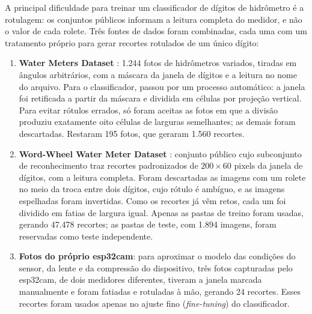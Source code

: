 A principal dificuldade para treinar um classificador de dígitos de hidrômetro é a
rotulagem: os conjuntos públicos informam a leitura completa do medidor, e não o valor de
cada rolete. Três fontes de dados foram combinadas, cada uma com um tratamento próprio
para gerar recortes rotulados de um único dígito:

\begin{enumerate}
    \item \textbf{Water Meters Dataset} \cite{kucev2020}: 1.244 fotos de hidrômetros
    variados, tiradas em ângulos arbitrários, com a máscara da janela de dígitos e a
    leitura no nome do arquivo. Para o classificador, passou por um processo automático: a janela foi retificada a partir da
    máscara e dividida em células por projeção vertical. Para evitar rótulos errados, só
    foram aceitas as fotos em que a divisão produziu exatamente oito células de larguras
    semelhantes; as demais foram descartadas. Restaram 195 fotos, que geraram 1.560 recortes.
    \item \textbf{Word-Wheel Water Meter Dataset} \cite{zhao2026wordwheel}: conjunto público
    cujo subconjunto de reconhecimento traz recortes padronizados de $200 \times 60$ pixels
    da janela de dígitos, com a leitura completa. Foram descartadas as imagens com um rolete
    no meio da troca entre dois dígitos, cujo rótulo é ambíguo, e as imagens espelhadas
    foram invertidas. Como os recortes já vêm retos, cada um foi dividido em fatias de
    largura igual. Apenas as pastas de treino foram usadas, gerando 47.478 recortes; as
    pastas de teste, com 1.894 imagens, foram reservadas como teste independente.
    \item \textbf{Fotos do próprio \gls{esp32cam}}: para aproximar o modelo das condições
    do sensor, da lente e da compressão do dispositivo, três fotos capturadas pelo
    \gls{esp32cam}, de dois medidores diferentes, tiveram a janela marcada manualmente e
    foram fatiadas e rotuladas à mão, gerando 24 recortes. Esses recortes foram usados
    apenas no ajuste fino (\textit{fine-tuning}) do classificador.
\end{enumerate}